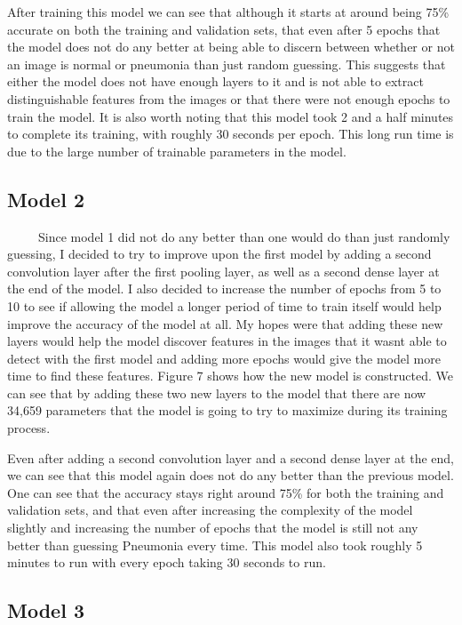\documentclass[12pt]{article}
\begin{document}
After training this model we can see that although it starts at around
being 75\% accurate on both the training and validation sets, that even
after 5 epochs that the model does not do any better at being able to
discern between whether or not an image is normal or pneumonia than just
random guessing. This suggests that either the model does not have
enough layers to it and is not able to extract distinguishable features
from the images or that there were not enough epochs to train the model.
It is also worth noting that this model took 2 and a half minutes to
complete its training, with roughly 30 seconds per epoch. This long run
time is due to the large number of trainable parameters in the model.

\hypertarget{model-2}{%
\subsection{Model 2}\label{model-2}}

~~~~~Since model 1 did not do any better than one would do than just
randomly guessing, I decided to try to improve upon the first model by
adding a second convolution layer after the first pooling layer, as well
as a second dense layer at the end of the model. I also decided to
increase the number of epochs from 5 to 10 to see if allowing the model
a longer period of time to train itself would help improve the accuracy
of the model at all. My hopes were that adding these new layers would
help the model discover features in the images that it wasnt able to
detect with the first model and adding more epochs would give the model
more time to find these features. Figure 7 shows how the new model is
constructed. We can see that by adding these two new layers to the model
that there are now 34,659 parameters that the model is going to try to
maximize during its training process.

Even after adding a second convolution layer and a second dense layer at
the end, we can see that this model again does not do any better than
the previous model. One can see that the accuracy stays right around
75\% for both the training and validation sets, and that even after
increasing the complexity of the model slightly and increasing the
number of epochs that the model is still not any better than guessing
Pneumonia every time. This model also took roughly 5 minutes to run with
every epoch taking 30 seconds to run.

\hypertarget{model-3}{%
\subsection{Model 3}\label{model-3}}
\end{document}
